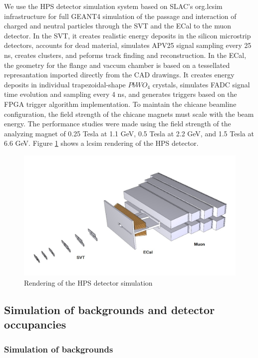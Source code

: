 \def\etal{{\it et al.\/}}


We use the HPS detector simulation system based on SLAC's org.lcsim infrastructure for full GEANT4
simulation of the passage and interaction of charged and neutral particles through the SVT 
and the ECal to the muon detector. In the SVT, it creates realistic energy deposits in the silicon 
microstrip detectors, accounts for dead material, simulates APV25 signal sampling every 25 ns, 
creates clusters, and peforms track finding and reconstruction.
In the ECal, the geometry for the flange and vaccum chamber is based on a tessellated 
represantation imported directly from the CAD drawings. It creates energy deposits in individual 
trapezoidal-shape $PbWO_4$ crystals, simulates FADC signal time evolution and sampling every 4 ns, and 
generates triggers based on the  FPGA trigger algorithm implementation.
To maintain the chicane beamline configuration, the field strength of the
chicane magnets must scale with the beam energy. The performance studies were 
made using the field strength of the 
analyzing magnet of 0.25 Tesla at 1.1 GeV, 0.5 Tesla at 2.2 GeV, and 
1.5 Tesla at 6.6 GeV.
Figure  \ref{fig:lcsim} shows a lcsim rendering of the HPS detector.

\begin{figure}[h]
\includegraphics[width=\textwidth]{performance/lcsimDetector}
\caption{\small{ Rendering of the HPS detector simulation}}
\label{fig:lcsim}
\end{figure}

\subsection{Simulation of backgrounds and detector occupancies}

\subsubsection{Simulation of backgrounds}
\label{sec:backgrounds}

